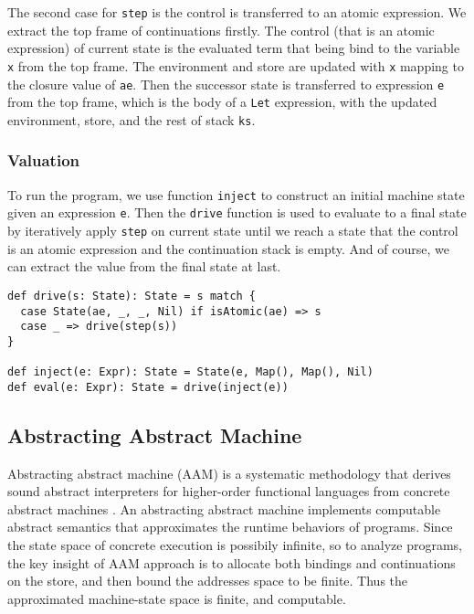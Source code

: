 \documentclass[acmsmall,review,anonymous]{acmart}\settopmatter{printfolios=true,printccs=false,printacmref=false}
\begin{document}
The second case for \texttt{step} is the control is transferred to an atomic expression.
We extract the top frame of continuations firstly.
The control (that is an atomic expression) of current state is the evaluated term
that being bind to the variable \texttt{x} from the top frame.
The environment and store are updated with \texttt{x} mapping to the closure value of \texttt{ae}.
Then the successor state is transferred to expression \texttt{e} from the top frame,
which is the body of a \texttt{Let} expression, with the updated environment, store, and
the rest of stack \texttt{ks}.

\subsubsection{Valuation}

To run the program, we use function \texttt{inject} to construct an initial machine
state given an expression \texttt{e}.
Then the \texttt{drive} function is used to evaluate
to a final state by iteratively apply \texttt{step} on current state until we reach a state
that the control is an atomic expression and the continuation stack is empty.
And of course, we can extract the value from the final state at last.

\begin{verbatim}
def drive(s: State): State = s match {
  case State(ae, _, _, Nil) if isAtomic(ae) => s
  case _ => drive(step(s))
}

def inject(e: Expr): State = State(e, Map(), Map(), Nil)
def eval(e: Expr): State = drive(inject(e))
\end{verbatim}

\subsection{Abstracting Abstract Machine} \label{aam}
Abstracting abstract machine (AAM) is a systematic methodology that derives sound 
abstract interpreters for higher-order functional languages from concrete 
abstract machines \cite{van2012systematic, van2010abstracting}. 
An abstracting abstract machine implements computable abstract semantics that 
approximates the runtime behaviors of programs.
Since the state space of concrete execution is possibily infinite,
so to analyze programs, the key insight of AAM approach is to allocate both bindings
and continuations on the store, and then bound the addresses space to be finite.
Thus the approximated machine-state space is finite, and computable.
\end{document}
